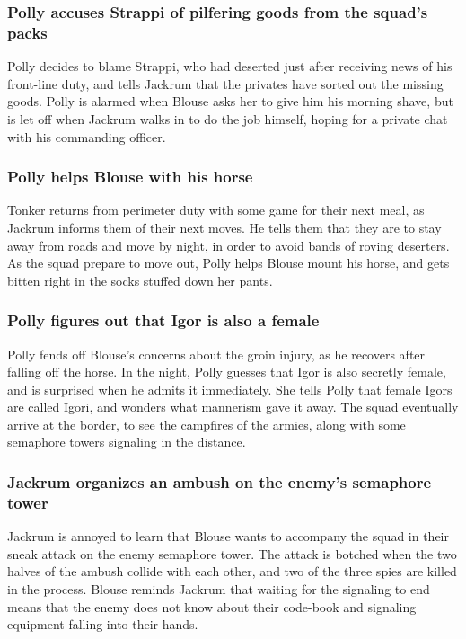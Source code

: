 \subsubsection{\Gls{Polly} accuses \Gls{Strappi} of pilfering goods from the squad's packs}
\Gls{Polly} decides to blame \Gls{Strappi}, who had deserted just after receiving news of his
front-line duty, and tells \Gls{Jackrum} that the privates have sorted out the missing goods.
\Gls{Polly} is alarmed when \Gls{Blouse} asks her to give him his morning shave, but is let off when
\Gls{Jackrum} walks in to do the job himself, hoping for a private chat with his commanding officer.

\subsubsection{\Gls{Polly} helps \Gls{Blouse} with his horse}
\Gls{Tonker} returns from perimeter duty with some game for their next meal, as \Gls{Jackrum}
informs them of their next moves. He tells them that they are to stay away from roads and move by
night, in order to avoid bands of roving deserters. As the squad prepare to move out, \Gls{Polly}
helps \Gls{Blouse} mount his horse, and gets bitten right in the socks stuffed down her pants.

\subsubsection{\Gls{Polly} figures out that \Gls{Igor} is also a female}
\Gls{Polly} fends off \Gls{Blouse}'s concerns about the groin injury, as he recovers after falling
off the horse. In the night, \Gls{Polly} guesses that \Gls{Igor} is also secretly female, and is
surprised when he admits it immediately. She tells \Gls{Polly} that female Igors are called
\Gls{Igori}, and wonders what mannerism gave it away. The squad eventually arrive at the border,
to see the campfires of the armies, along with some semaphore towers signaling in the distance.

\subsubsection{\Gls{Jackrum} organizes an ambush on the enemy's semaphore tower}
\Gls{Jackrum} is annoyed to learn that \Gls{Blouse} wants to accompany the squad in their sneak
attack on the enemy semaphore tower. The attack is botched when the two halves of the ambush
collide with each other, and two of the three spies are killed in the process. \Gls{Blouse} reminds
\Gls{Jackrum} that waiting for the signaling to end means that the enemy does not know about their
code-book and signaling equipment falling into their hands.


